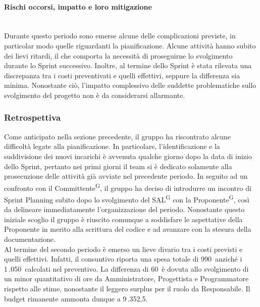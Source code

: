\documentclass[8pt]{article}
\newcommand{\glossterm}[1]{#1\textsuperscript{G}} %
\newcommand{\subsubsubsection}[1]{\paragraph{#1}\mbox{}\\}
\begin{document}
\subsubsubsection{Rischi occorsi, impatto e loro mitigazione}
Durante questo periodo sono emerse alcune delle complicazioni previste, in particolar modo quelle riguardanti la pianificazione. Alcune attività hanno subito dei lievi ritardi, il che comporta la necessità di proseguirne lo svolgimento durante lo Sprint successivo. Inoltre, al termine dello Sprint è stata rilevata una discrepanza tra i costi preventivati e quelli effettivi, seppure la differenza sia minima. Nonostante ciò, l'impatto complessivo delle suddette problematiche sullo svolgimento del progetto non è da considerarsi allarmante.
\subsubsection{Retrospettiva}
Come anticipato nella sezione precedente, il gruppo ha riscontrato alcune difficoltà legate alla pianificazione. In particolare, l'identificazione e la suddivisione dei nuovi incarichi è avvenuta qualche giorno dopo la data di inizio dello Sprint, pertanto nei primi giorni il team si è dedicato solamente alla prosecuzione delle attività già avviate nel precedente periodo. In seguito ad un confronto con il \glossterm{Committente}, il gruppo ha deciso di introdurre un incontro di Sprint Planning subito dopo lo svolgimento del \glossterm{SAL} con la \glossterm{Proponente}, così da delineare immediatamente l'organizzazione del periodo. Nonostante questo iniziale scoglio il gruppo è riuscito comunque a soddisfare le aspettative della Proponente in merito alla scrittura del codice e ad avanzare con la stesura della documentazione. \\
Al termine del secondo periodo è emerso un lieve divario tra i costi previsti e quelli effettivi.
Infatti, il consuntivo riporta una spesa totale di 990\;\texteuro\ anziché i 1\,.050\;\texteuro\ calcolati
nel preventivo. La differenza di 60\;\texteuro\ è dovuta allo svolgimento di un minor quantitativo di
ore da Amministratore, Progettista e Programmatore rispetto alle stime, nonostante il leggero
surplus per il ruolo da Responsabile. Il budget rimanente ammonta dunque a 9\,.352,5\;\texteuro. 
\end{document}
